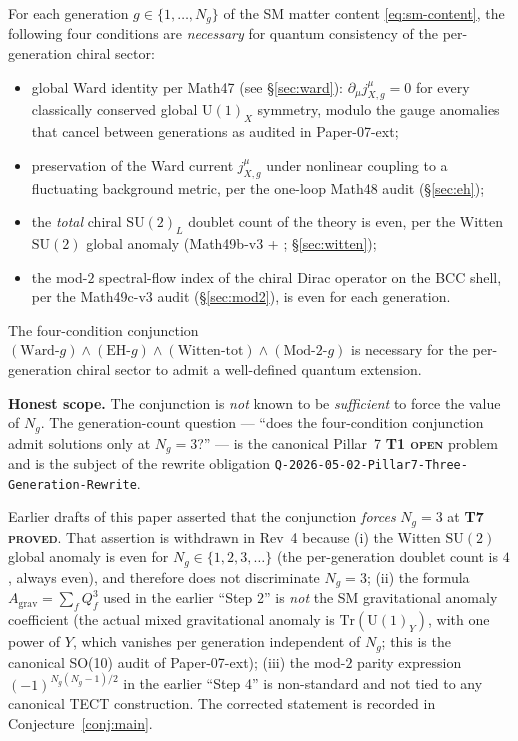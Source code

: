 \begin{conjecture}\label{conj:main}
For each generation $g\in\{1,\dots,N_g\}$ of the SM matter content
\eqref{eq:sm-content}, the following four conditions are
\emph{necessary} for quantum consistency of the per-generation chiral
sector:
\begin{itemize}
  \item[(\textbf{Ward-$g$})] global Ward identity per Math47 (see
    \S\ref{sec:ward}): $\partial_\mu j^{\mu}_{X,g} = 0$ for every
    classically conserved global $\mathrm{U}(1)_X$ symmetry, modulo
    the gauge anomalies that cancel between generations as audited in
    Paper-07-ext;
  \item[(\textbf{EH-$g$})] preservation of the Ward current
    $j^{\mu}_{X,g}$ under nonlinear coupling to a fluctuating
    background metric, per the one-loop Math48 audit
    (\S\ref{sec:eh});
  \item[(\textbf{Witten-tot})] the \emph{total} chiral
    $\mathrm{SU}(2)_L$ doublet count of the theory is even, per the
    Witten $\mathrm{SU}(2)$ global anomaly (Math49b-v3 +
    \cite{Witten1982}; \S\ref{sec:witten});
  \item[(\textbf{Mod-2-$g$})] the mod-$2$ spectral-flow index of the
    chiral Dirac operator on the BCC shell, per the Math49c-v3
    audit (\S\ref{sec:mod2}), is even for each generation.
\end{itemize}
The four-condition conjunction
$(\text{Ward-}g)\wedge(\text{EH-}g)\wedge
(\text{Witten-tot})\wedge(\text{Mod-2-}g)$ is necessary for the
per-generation chiral sector to admit a well-defined quantum
extension.

\textbf{Honest scope.} The conjunction is \emph{not} known to be
\emph{sufficient} to force the value of $N_g$. The generation-count
question --- ``does the four-condition conjunction admit solutions
only at $N_g = 3$?'' --- is the canonical Pillar~7 \textbf{T1
\textsc{open}} problem and is the subject of the rewrite obligation
\texttt{Q-2026-05-02-Pillar7-Three-Generation-Rewrite}.
\end{conjecture}

\begin{remark}\label{rmk:diff}
Earlier drafts of this paper asserted that the conjunction
\emph{forces} $N_g = 3$ at \textbf{T7 \textsc{proved}}. That assertion
is withdrawn in Rev~4 because (i) the Witten $\mathrm{SU}(2)$ global
anomaly is even for $N_g\in\{1,2,3,\dots\}$ (the per-generation
doublet count is $4$, always even), and therefore does not
discriminate $N_g = 3$; (ii) the formula
$A_{\mathrm{grav}}=\sum_f Q_f^3$ used in the earlier ``Step 2'' is
\emph{not} the SM gravitational anomaly coefficient (the actual mixed
gravitational anomaly is $\mathrm{Tr}(\mathrm{U}(1)_Y)$, with one
power of $Y$, which vanishes per generation independent of $N_g$;
this is the canonical SO(10) audit of Paper-07-ext); (iii) the
mod-$2$ parity expression $(-1)^{N_g(N_g-1)/2}$ in the earlier
``Step 4'' is non-standard and not tied to any canonical TECT
construction. The corrected statement is recorded in
Conjecture~\ref{conj:main}.
\end{remark}

